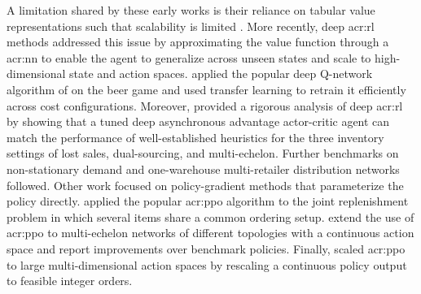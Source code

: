 A limitation shared by these early works is their reliance on tabular value representations such that scalability is limited \citep{boute2022roadmap}. More recently, deep \gls{acr:rl} methods addressed this issue by approximating the value function through a \gls{acr:nn} to enable the agent to generalize
across unseen states and scale to high-dimensional state and action spaces. \citet{oroojlooyjadid2022dqn} applied the popular deep Q-network algorithm of \citet{Mnih2015} on the beer game and used transfer learning to retrain it efficiently across cost configurations. Moreover, \citet{gijsbrechts2022candrl} provided a rigorous analysis of deep \gls{acr:rl} by showing that a tuned deep asynchronous advantage actor-critic agent can match the performance of well-established heuristics for the three inventory settings of lost sales, dual-sourcing, and multi-echelon. Further benchmarks on non-stationary demand \citep{dehaybe2024nonstationary} and one-warehouse multi-retailer distribution
networks \citep{kaynov2024owmr} followed. Other work focused on policy-gradient methods that parameterize the policy directly. \citet{vanvuchelen2020ppo} applied the popular \gls{acr:ppo} algorithm \citep{schulman2017} to the joint
replenishment problem in which several items share a common ordering setup. \citet{geevers2024ppo} extend the use of \gls{acr:ppo} to multi-echelon networks of different topologies with a continuous action space and report improvements over benchmark policies. Finally, \citet{vanvuchelen2024continuous} scaled \gls{acr:ppo} to large multi-dimensional action spaces by rescaling a continuous policy output to feasible integer orders.\\ 

